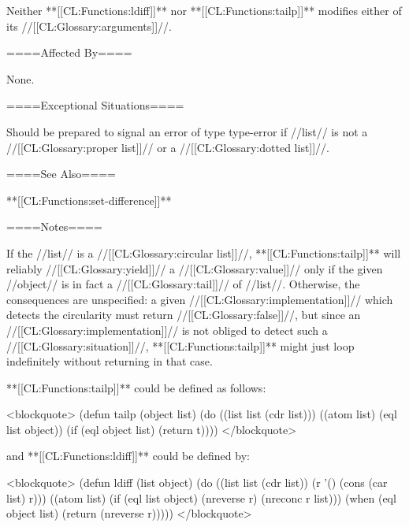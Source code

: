 Neither **[[CL:Functions:ldiff]]** nor **[[CL:Functions:tailp]]** modifies either of its //[[CL:Glossary:arguments]]//.

====Affected By====

None.

====Exceptional Situations====

Should be prepared to signal an error of type type-error if //list// is not a //[[CL:Glossary:proper list]]// or a //[[CL:Glossary:dotted list]]//.

====See Also====

**[[CL:Functions:set-difference]]**

====Notes====

If the //list// is a //[[CL:Glossary:circular list]]//, **[[CL:Functions:tailp]]** will reliably //[[CL:Glossary:yield]]// a //[[CL:Glossary:value]]// only if the given //object// is in fact a //[[CL:Glossary:tail]]// of //list//. Otherwise, the consequences are unspecified: a given //[[CL:Glossary:implementation]]// which detects the circularity must return //[[CL:Glossary:false]]//, but since an //[[CL:Glossary:implementation]]// is not obliged to detect such a //[[CL:Glossary:situation]]//, **[[CL:Functions:tailp]]** might just loop indefinitely without returning in that case.

**[[CL:Functions:tailp]]** could be defined as follows:

<blockquote> (defun tailp (object list) (do ((list list (cdr list))) ((atom list) (eql list object)) (if (eql object list) (return t)))) </blockquote>

and **[[CL:Functions:ldiff]]** could be defined by:

<blockquote> (defun ldiff (list object) (do ((list list (cdr list)) (r '() (cons (car list) r))) ((atom list) (if (eql list object) (nreverse r) (nreconc r list))) (when (eql object list) (return (nreverse r))))) </blockquote>

     
